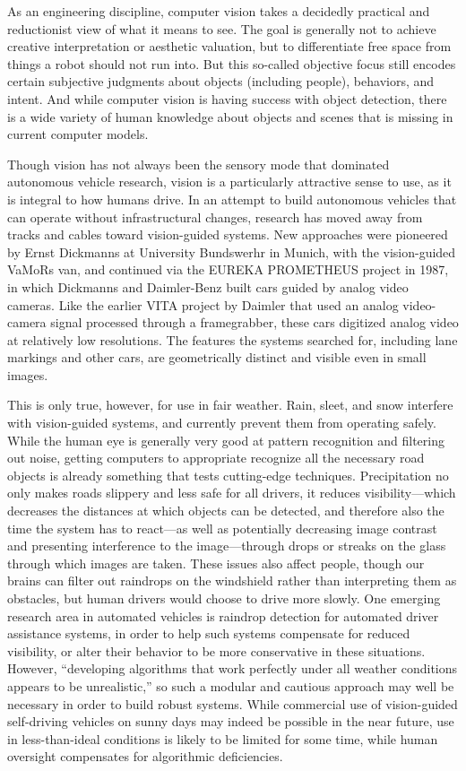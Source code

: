 As an engineering discipline, computer vision takes a decidedly
practical and reductionist view of what it means to see. The goal is
generally not to achieve creative interpretation or aesthetic
valuation, but to differentiate free space from things a robot should
not run into.\cite{???} But this so-called objective focus still encodes
certain subjective judgments about objects (including people),
behaviors, and intent. And while computer vision is having success
with object detection, there is a wide variety of human knowledge
about objects and scenes that is missing in current computer models.\cite{???}

Though vision has not always been the sensory mode that dominated
autonomous vehicle research, vision is a particularly attractive sense to
use, as it is integral to how humans drive. In an attempt to build
autonomous vehicles that can operate without infrastructural changes,
research has moved away from tracks and cables toward vision-guided
systems. New approaches were pioneered by Ernst Dickmanns at
University Bundswerhr in Munich, with the vision-guided VaMoRs van,
and continued via the EUREKA PROMETHEUS project in 1987, in which
Dickmanns and Daimler-Benz built cars guided by analog video
cameras.\cite{???} Like the earlier VITA project by Daimler that used an
analog video-camera signal processed through a framegrabber, these
cars digitized analog video at relatively low resolutions. The
features the systems searched for, including lane markings and other
cars, are geometrically distinct and visible even in small images.\cite{???}

This is only true, however, for use in fair weather. Rain, sleet, and
snow interfere with vision-guided systems, and currently prevent them
from operating safely. While the human eye is generally very good at
pattern recognition and filtering out noise, getting computers to appropriate recognize all
the necessary road objects is already something that tests
cutting-edge techniques. Precipitation no only makes roads slippery
and less safe for all drivers, it reduces visibility---which decreases
the distances at which objects can be detected, and therefore also the
time the system has to react---as well as potentially decreasing image
contrast and presenting interference to the image---through drops or
streaks on the glass through which images are taken.\cite{???-rainACAS} These issues also
affect people, though our brains can filter out raindrops on the
windshield rather than interpreting them as obstacles, but human
drivers would choose to drive more slowly. One emerging research area
in automated vehicles is raindrop detection for automated driver
assistance systems, in order to help such systems compensate for
reduced visibility, or alter their behavior to be more conservative in
these situations. However, ``developing algorithms that work perfectly
under all weather conditions appears to be unrealistic,'' so such a
modular and cautious approach may well be necessary in order to build
robust systems.\cite{???-rainACAS} While commercial use of vision-guided self-driving vehicles on
sunny days may indeed be possible in the near future, use in
less-than-ideal conditions is likely to be limited for some time,
while human oversight compensates for algorithmic deficiencies. 

